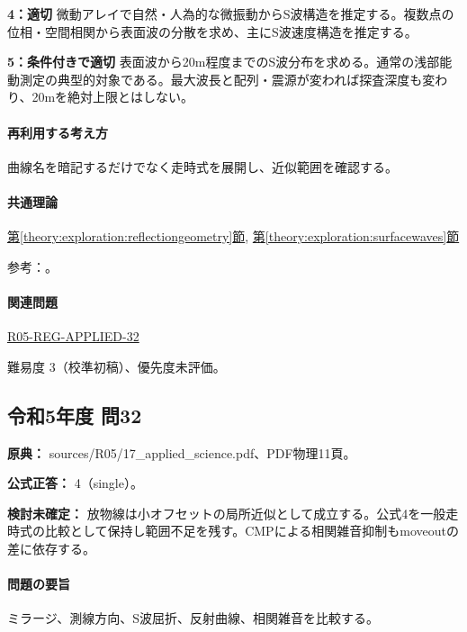 \noindent\textbf{4：適切} 微動アレイで自然・人為的な微振動からS波構造を推定する。複数点の位相・空間相関から表面波の分散を求め、主にS波速度構造を推定する。\par

\noindent\textbf{5：条件付きで適切} 表面波から20m程度までのS波分布を求める。通常の浅部能動測定の典型的対象である。最大波長と配列・震源が変われば探査深度も変わり、20mを絶対上限とはしない。\par

\paragraph{再利用する考え方} 曲線名を暗記するだけでなく走時式を展開し、近似範囲を確認する。

\paragraph{共通理論} \hyperref[theory:exploration:reflectiongeometry]{第\ref*{theory:exploration:reflectiongeometry}節}, \hyperref[theory:exploration:surfacewaves]{第\ref*{theory:exploration:surfacewaves}節}

\par 参考：\cite{epa_seismic_reflection,jica_refraction2015,moe_surface2004,epa_surfacewaves}。

\paragraph{関連問題} \hyperref[q:r05-reg-applied-32]{R05-REG-APPLIED-32}

\par 難易度 3（校準初稿）、優先度未評価。

\subsection{令和5年度 問32}
\label{q:r05-reg-applied-32}

\noindent\textbf{原典：} sources/R05/17\_applied\_science.pdf、PDF物理11頁。

\textbf{公式正答：} 4（single）。

\par\textbf{検討未確定：} 放物線は小オフセットの局所近似として成立する。公式4を一般走時式の比較として保持し範囲不足を残す。CMPによる相関雑音抑制もmoveoutの差に依存する。

\paragraph{問題の要旨} ミラージ、測線方向、S波屈折、反射曲線、相関雑音を比較する。

